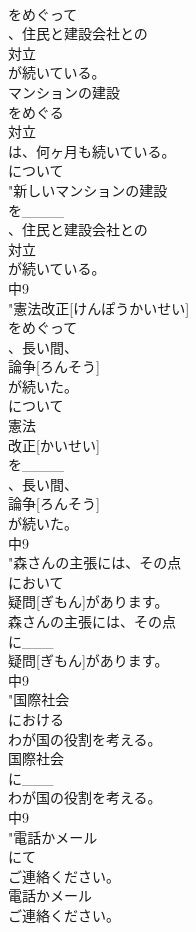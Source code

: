 \documentclass[8pt]{extreport}
\begin{document}
\begin{CJK}{UTF8}{min}
\\	をめぐって
\\	、住民と建設会社との
\\	対立
\\	が続いている。
\\	マンションの建設
\\	をめぐる
\\	対立
\\	は、何ヶ月も続いている。
\\	について 
\\	"新しいマンションの建設
\\	を____
\\	、住民と建設会社との
\\	対立
\\	が続いている。
\\	中9
\\	"憲法改正[けんぽうかいせい]
\\	をめぐって
\\	、長い間、
\\	論争[ろんそう]
\\	が続いた。
\\	について 
\\	憲法
\\	改正[かいせい]
\\	を____
\\	、長い間、
\\	論争[ろんそう]
\\	が続いた。
\\	中9
\\	"森さんの主張には、その点
\\	において
\\	疑問[ぎもん]があります。
\\	森さんの主張には、その点
\\	に___
\\	疑問[ぎもん]があります。
\\	中9
\\	"国際社会
\\	における
\\	わが国の役割を考える。
\\	国際社会
\\	に___
\\	わが国の役割を考える。
\\	中9
\\	"電話かメール
\\	にて
\\	ご連絡ください。
\\	電話かメール
\\	ご連絡ください。

\end{CJK}
\end{document}
